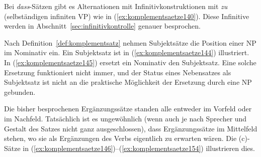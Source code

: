 Bei \textit{dass}-Sätzen gibt es Alternationen mit Infinitivkonstruktionen mit \textit{zu} (selbständigen infiniten VP) wie in (\ref{ex:komplementsaetze140}).
Diese Infinitive werden in Abschnitt~\ref{sec:infinitivkontrolle} genauer besprochen.

\begin{exe}
  \ex\label{ex:komplementsaetze140}
  \begin{xlist}
  \end{xlist}
\end{exe}

Nach Definition~\ref{def:komplementsatz} nehmen Subjektsätze die Position einer NP im Nominativ ein.
Ein Subjektsatz ist in (\ref{ex:komplementsaetze144}) illustriert.
In (\ref{ex:komplementsaetze145}) ersetzt ein Nominativ den Subjektsatz.
Eine solche Ersetzung funktioniert nicht immer, und der Status eines Nebensatzes als Subjektsatz ist nicht an die praktische Möglichkeit der Ersetzung durch eine NP gebunden.


\begin{exe}
  \ex\label{ex:komplementsaetze143}
  \begin{xlist}
  \end{xlist}
\end{exe}


Die bisher besprochenen Ergänzungssätze standen alle entweder im Vorfeld oder im Nachfeld.
Tatsächlich ist es ungewöhnlich (wenn auch je nach Sprecher und Gestalt des Satzes nicht ganz ausgeschlossen), dass Ergänzungssätze im Mittelfeld stehen, wo sie als Ergänzungen des Verbs eigentlich zu erwarten wären.
Die (c)-Sätze in (\ref{ex:komplementsaetze146})--(\ref{ex:komplementsaetze154}) illustrieren dies.


